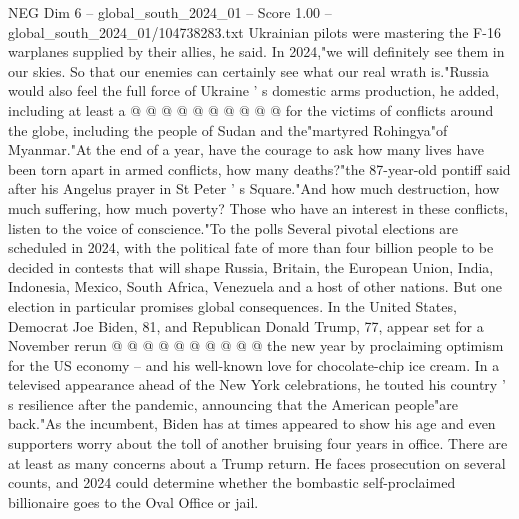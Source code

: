 \begin{textsample}{NEG Dim 6 – global\_south\_2024\_01 – Score 1.00 – global\_south\_2024\_01/104738283.txt}
Ukrainian pilots were mastering the F-16 warplanes supplied by their allies, he said.
In 2024,"we will definitely see them in our skies.
So that our enemies can certainly see what our real wrath is."Russia would also feel the full force of Ukraine ' s domestic arms production, he added, including at least a @ @ @ @ @ @ @ @ @ @ for the victims of conflicts around the globe, including the people of Sudan and the"martyred Rohingya"of Myanmar."At the end of a year, have the courage to ask how many lives have been torn apart in armed conflicts, how many deaths?"the 87-year-old pontiff said after his Angelus prayer in St Peter ' s Square."And how much destruction, how much suffering, how much poverty?
Those who have an interest in these conflicts, listen to the voice of conscience."To the polls Several pivotal elections are scheduled in 2024, with the political fate of more than four billion people to be decided in contests that will shape Russia, Britain, the European Union, India, Indonesia, Mexico, South Africa, Venezuela and a host of other nations.
But one election in particular promises global consequences.
In the United States, Democrat Joe Biden, 81, and Republican Donald Trump, 77, appear set for a November rerun @ @ @ @ @ @ @ @ @ @ the new year by proclaiming optimism for the US economy -- and his well-known love for chocolate-chip ice cream.
In a televised appearance ahead of the New York celebrations, he touted his country ' s resilience after the pandemic, announcing that the American people"are back."As the incumbent, Biden has at times appeared to show his age and even supporters worry about the toll of another bruising four years in office.
There are at least as many concerns about a Trump return.
He faces prosecution on several counts, and 2024 could determine whether the bombastic self-proclaimed billionaire goes to the Oval Office or jail.

\end{textsample}
